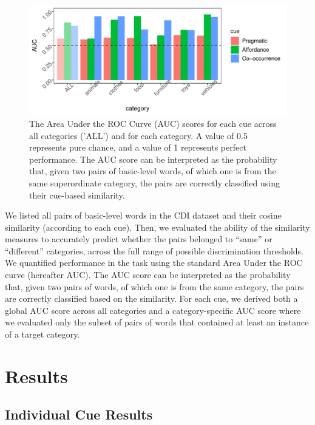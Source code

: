 \documentclass[english,,man,floatsintext]{apa6}
\begin{document}
\begin{figure}[h]

{\centering \includegraphics{cogsci_journal_files/figure-latex/data-all-1} 

}

\caption{\label{fig:data-all} The Area Under the ROC Curve (AUC) scores for each cue across all categories ('ALL') and for each category. A value of 0.5 represents pure chance, and a value of 1 represents perfect performance. The AUC score can be interpreted as the probability that, given two pairs of basic-level words, of which one is from the same superordinate category, the pairs are correctly classified using their  cue-based similarity.}\label{fig:data-all}
\end{figure}

We listed all pairs of basic-level words in the CDI dataset and their cosine similarity (according to each cue). Then, we evaluated the ability of the similarity measures to accurately
predict whether the pairs belonged to \enquote{same} or \enquote{different}
categories, across the full range of possible discrimination thresholds.
We quantified performance in the task using the standard Area Under the ROC curve (hereafter AUC).
The AUC score can be interpreted as the probability that, given two pairs of words, of which one is from the
same category, the pairs are correctly classified based on the
similarity. For each cue, we derived both a global AUC score across all
categories and a category-specific AUC score where we evaluated only the
subset of pairs of words that contained at least an instance of a target
category.

\hypertarget{results}{%
\section{Results}\label{results}}

\hypertarget{individual-cue-results}{%
\subsection{Individual Cue Results}\label{individual-cue-results}}
\end{document}

